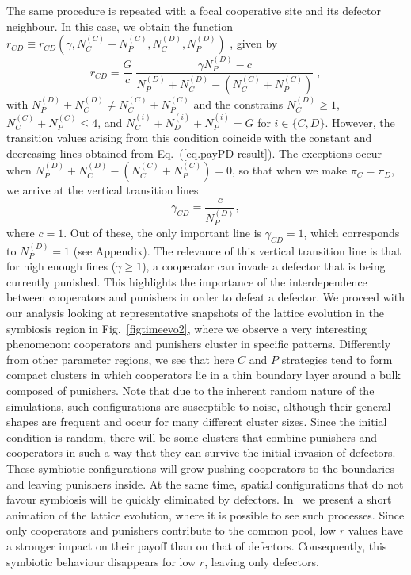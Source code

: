 \documentclass[5p]{elsarticle}
\def\NCC{N^{{\scriptscriptstyle(C)}}_{C}}
\def\NCP{N^{{\scriptscriptstyle(C)}}_{P}}
\def\NDP{N^{{\scriptscriptstyle(D)}}_{P}}
\def\NDC{N^{{\scriptscriptstyle(D)}}_{C}}
\begin{document}
%
The same procedure is repeated with a focal cooperative site and its defector neighbour. In this case, we obtain the {function}  $ r_{CD} \equiv r_{CD}(\gamma, \NCC+\NCP,\NDC,\NDP) $ {, given by}
\begin{equation} \label{eq.payCD}
r_{CD}=\frac{G}{c} \; \frac{\gamma \NDP-c} {\NDP+\NDC-(\NCC+\NCP)} \;,
\end{equation}
with $\NDP+\NDC\neq \NCC+\NCP$ {and the constrains $\NDC \geq 1 $, $\NCC+\NCP \leq 4$, and $N^{\scriptscriptstyle(i)}_C + N^{\scriptscriptstyle(i)}_D + N^{\scriptscriptstyle(i)}_P=G$ for $i\in\{C,D\}$. However, the transition values arising from this condition coincide with the constant and decreasing lines  obtained from }  Eq.~(\ref{eq.payPD-result}).  {The exceptions occur when} $\NDP+\NDC-(\NCC+\NCP) = 0$, {so that when we make $\pi_C=\pi_D$, we arrive at the vertical transition lines}
\begin{equation}
\label{eq.vertical-transitions}
\gamma_{CD} =\frac{c}{N^{\scriptscriptstyle(D)}_P},
\end{equation}
where $ c = 1 $. {Out of these, the only important line is $ \gamma_{CD} = 1 $, which corresponds to $N^{\scriptscriptstyle(D)}_P=1$ (see Appendix).}
{The relevance of this vertical transition line is that}  for high enough fines ($ \gamma \geq 1 $), a cooperator can invade a defector that is being currently punished. This highlights the importance of the interdependence between cooperators and punishers in order to defeat a defector.
We proceed with our analysis looking at representative snapshots of the lattice evolution in the symbiosis region in  Fig.~\ref{figtimeevo2}, where we observe a very interesting phenomenon: cooperators and punishers cluster in specific patterns.
%
Differently from other parameter regions, we see that {here} $C$ and $P$ strategies tend to form compact clusters in which cooperators lie in a thin boundary layer around a bulk composed of punishers.
%
Note that due to the inherent random nature of the simulations, {such} configurations are susceptible to noise, although their general shapes are frequent and occur for many different cluster sizes.
%
Since the initial condition is random, there will be some clusters that combine punishers and cooperators in such a way that they can survive the initial invasion of defectors. These symbiotic configurations will grow pushing cooperators to the boundaries and leaving punishers inside. At the same time, spatial configurations that do not favour symbiosis will be quickly eliminated by defectors. 
%
In~\cite{gif_fig4} we present a short animation of the lattice evolution, where it is possible to see such processes. 
%
Since only cooperators and punishers contribute to the common pool, low $r$ values have a stronger impact on their payoff than on that of defectors. Consequently, this symbiotic behaviour disappears for low $r$, leaving only defectors.
\end{document}
